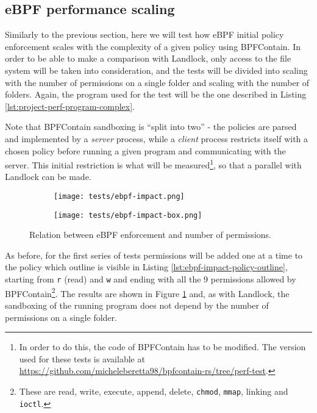 \subsection{eBPF performance scaling}
\label{sec:performance-internal-analysis-ebpf-impact}

Similarly to the previous section, here we will test how eBPF initial policy enforcement scales with the complexity
of a given policy using BPFContain. In order to be able to make a comparison with Landlock, only
access to the file system will be taken into consideration, and the tests
will be divided into scaling with the number of permissions on a single folder
and scaling with the number of folders.
Again, the program used for the test will be the one described in Listing \ref{lst:project-perf-program-complex}.

Note that BPFContain sandboxing is ``split into two'' - the policies are parsed
and implemented by a \textit{server} process, while a \textit{client} process restricts itself
with a chosen policy before running a given program and communicating with the server.
This initial restriction is what will be
measured\footnote{In order to do this, the code of BPFContain has to be modified. The version
used for these tests is available at \url{https://github.com/micheleberetta98/bpfcontain-rs/tree/perf-test}.},
so that a parallel with Landlock can be made.

\begin{figure}[hbt!]
  \centering
  \begin{subfigure}[b]{0.49\textwidth}
    \texttt{[image: tests/ebpf-impact.png]}
  \end{subfigure}
  \begin{subfigure}[b]{0.49\textwidth}
    \texttt{[image: tests/ebpf-impact-box.png]}
  \end{subfigure}

  \caption{Relation between eBPF enforcement and number of permissions.}
  \label{fig:perf-test-ebpf-impact-permissions}
\end{figure}

As before, for the first series of tests permissions will be added one at a time to the policy
which outline is visible in Listing \ref{lst:ebpf-impact-policy-outline}, starting from \texttt{r} (read) and \texttt{w} and ending with
all the 9 permissions allowed by BPFContain\footnote{These are read, write, execute, append, delete, \texttt{chmod},
\texttt{mmap}, linking and \texttt{ioctl}.}.
The results are shown in Figure \ref{fig:perf-test-ebpf-impact-permissions} and, as with Landlock, 
the sandboxing of the running program does not depend by the number of permissions on a single folder.

